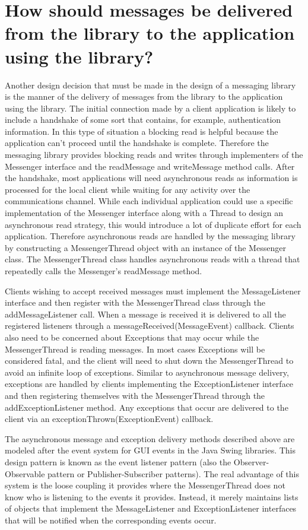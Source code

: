 \documentclass{article}
\begin{document}
\section{How should messages be delivered from the library to the application using the library?}

Another design decision that must be made in the design of a messaging
library is the manner of the delivery of messages from the library to
the application using the library.  The initial connection made by a
client application is likely to include a handshake of some sort that
contains, for example, authentication information.  In this type of
situation a blocking read is helpful because the application can't
proceed until the handshake is complete.  Therefore the messaging
library provides blocking reads and writes through implementers of
the Messenger interface and the readMessage and writeMessage method
calls.  After the handshake, most applications will need asynchronous
reads as information is processed for the local client while waiting
for any activity over the communications channel.  While each
individual application could use a specific implementation of the
Messenger interface along with a Thread to design an asynchronous read
strategy, this would introduce a lot of duplicate effort for each
application.  Therefore asynchronous reads are handled by the
messaging library by constructing a MessengerThread object with an
instance of the Messenger class.  The MessengerThread class handles
asynchronous reads with a thread that repeatedly calls the
Messenger's readMessage method.

Clients wishing to accept received messages must implement the
MessageListener interface and then register with the
MessengerThread class through the addMessageListener call.  When a
message is received it is delivered to all the registered listeners
through a messageReceived(MessageEvent) callback.  Clients also need
to be concerned about Exceptions that may occur while the
MessengerThread is reading messages.  In most cases Exceptions will be
considered fatal, and the client will need to shut down the
MessengerThread to avoid an infinite loop of exceptions.  Similar to
asynchronous message delivery, exceptions are handled by clients
implementing the ExceptionListener interface and then registering
themselves with the MessengerThread through the addExceptionListener
method.  Any exceptions that occur are delivered to the client via an
exceptionThrown(ExceptionEvent) callback.

The asynchronous message and exception delivery methods described
above are modeled after the event system for GUI events in the Java
Swing libraries.  This design pattern is known as the event listener
pattern (also the Observer-Observable pattern or Publisher-Subscriber
patterns).  The real advantage of this system is the loose coupling it
provides where the MessengerThread does not know who is listening to
the events it provides.  Instead, it merely maintains lists of
objects that implement the MessageListener and ExceptionListener
interfaces that will be notified when the corresponding events occur.
\end{document}
